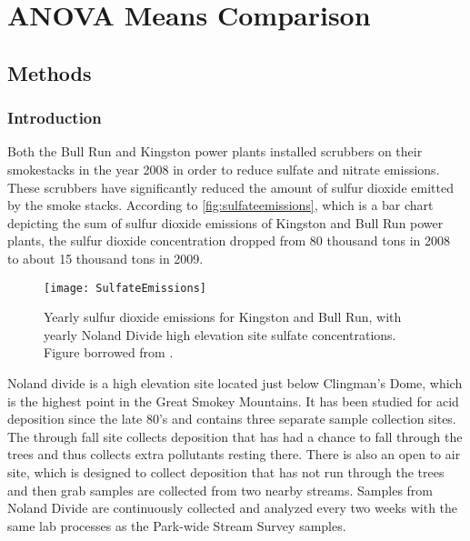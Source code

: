 \chapter{ANOVA Means Comparison}\label{ch:mc}
\section{Methods}
\subsection{Introduction}

Both the Bull Run and Kingston power plants installed scrubbers on their smokestacks in the year 2008 in order to reduce sulfate and nitrate emissions.
These scrubbers have significantly reduced the amount of sulfur dioxide emitted by the smoke stacks.
According to \autoref{fig:sulfateemissions}, which is a bar chart depicting the sum of sulfur dioxide emissions of Kingston and Bull Run power plants,  the sulfur dioxide concentration dropped from 80 thousand tons in 2008 to about 15 thousand tons in 2009.

\begin{figure}[h!]
  \centering
  \texttt{[image: SulfateEmissions]}\\
	\caption{Yearly sulfur dioxide emissions for Kingston and Bull Run, with yearly Noland Divide high elevation site sulfate concentrations. Figure borrowed from \citet{cai2013}.}
  \label{fig:sulfateemissions}
\end{figure}

Noland divide is a high elevation site located just below Clingman's Dome, which is the highest point in the Great Smokey Mountains.  
It has been studied for acid deposition since the late 80's and contains three separate sample collection sites.
The through fall site collects deposition that has had a chance to fall through the trees and thus collects extra pollutants resting there.
There is also an open to air site, which is designed to collect deposition that has not run through the trees and then grab samples are collected from two nearby streams.
Samples from Noland Divide are continuously collected and analyzed every two weeks with the same lab processes as the Park-wide Stream Survey samples.

